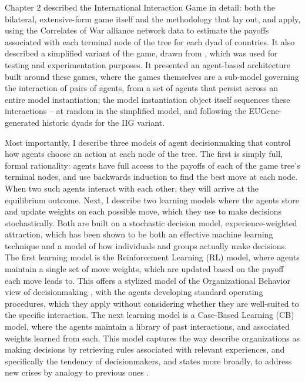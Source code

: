 Chapter 2 described the International Interaction Game in detail: both the bilateral, extensive-form game itself and the methodology that \citet{bdm_1992} lay out, and \citet{bennett_2000b} apply, using the Correlates of War alliance network data to estimate the payoffs associated with each terminal node of the tree for each dyad of countries. It also described a simplified variant of the game, drawn from \citet{signorino_1999}, which was used for testing and experimentation purposes. It presented an agent-based architecture built around these games, where the games themselves are a sub-model governing the interaction of pairs of agents, from a set of agents that persist across an entire model instantiation; the model instantiation object itself sequences these interactions -- at random in the simplified model, and following the EUGene-generated historic dyads for the IIG variant.

Most importantly, I describe three models of agent decisionmaking that control how agents choose an action at each node of the tree. The first is simply full, formal rationality: agents have full access to the payoffs of each of the game tree's terminal nodes, and use backwards induction to find the best move at each node. When two such agents interact with each other, they will arrive at the equilibrium outcome. Next, I describe two learning models where the agents store and update weights on each possible move, which they use to make decisions stochastically. Both are built on a stochastic decision model, experience-weighted attraction, which has been shown to be both an effective machine learning technique and a model of how individuals and groups actually make decisions. The first learning model is the Reinforcement Learning (RL) model, where agents maintain a single set of move weights, which are updated based on the payoff each move leads to. This offers a stylized model of the Organizational Behavior view of decisionmaking \citep{allison_1999}, with the agents developing standard operating procedures, which they apply without considering whether they are well-suited to the specific interaction. The next learning model is a Case-Based Learning (CB) model, where the agents maintain a library of past interactions, and associated weights learned from each. This model captures the way \citet{march_1993} describe organizations as making decisions by retrieving rules associated with relevant experiences, and specifically the tendency of decisionmakers, and states more broadly, to address new crises by analogy to previous ones \citep{khong_1992,schuman_1992}.

